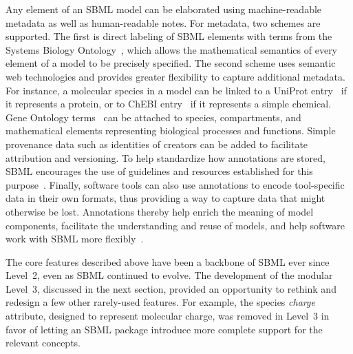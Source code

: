 \documentclass{sbml-paper}
\begin{document}
Any element of an SBML model can be elaborated using machine-readable metadata as well as human-readable notes.  For metadata, two schemes are supported.  The first is direct labeling of SBML elements with terms from the Systems Biology Ontology~\citep[SBO;][]{courtot2011controlled}, which allows the mathematical semantics of every element of a model to be precisely specified.  The second scheme uses semantic web technologies and provides greater flexibility to capture additional metadata.  For instance, a molecular species in a model can be linked to a UniProt entry~\citep{uniprot2017} if it represents a protein, or to ChEBI entry~\citep{hastings2013chebi} if it represents a simple chemical.  Gene Ontology terms~\citep[GO;][]{ashburner2000gene} can be attached to species, compartments, and mathematical elements representing biological processes and functions.  Simple provenance data such as identities of creators can be added to facilitate attribution and versioning.  To help standardize how annotations are stored, SBML encourages the use of guidelines and resources established for this purpose~\citep{le_novere_2005}.  Finally, software tools can also use annotations to encode tool-specific data in their own formats, thus providing a way to capture data that might otherwise be lost.  Annotations thereby help enrich the meaning of model components, facilitate the understanding and reuse of models, and help software work with SBML more flexibly~\citep{Neal2019harmonizing}.

The core features described above have been a backbone of SBML ever since Level~2, even as SBML continued to evolve.  The development of the modular Level~3, discussed in the next section, provided an opportunity to rethink and redesign a few other rarely-used features.  For example, the species \emph{charge} attribute, designed to represent molecular charge, was removed in Level~3 in favor of letting an SBML package introduce more complete support for the relevant concepts.
\end{document}
